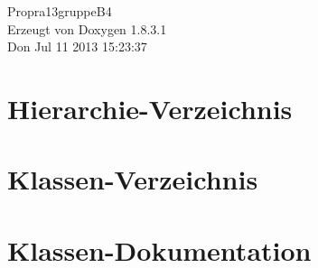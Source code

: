 \documentclass{book}
\begin{document}
\hypersetup{pageanchor=false,citecolor=blue}
\begin{titlepage}
\vspace*{7cm}
\begin{center}
{\Large Propra13gruppe\-B4 }\\
\vspace*{1cm}
{\large Erzeugt von Doxygen 1.8.3.1}\\
\vspace*{0.5cm}
{\small Don Jul 11 2013 15:23:37}\\
\end{center}
\end{titlepage}
\clearemptydoublepage
{}
\tableofcontents
\clearemptydoublepage
{}
\hypersetup{pageanchor=true,citecolor=blue}
\chapter{Hierarchie-\/\-Verzeichnis}

\chapter{Klassen-\/\-Verzeichnis}

\chapter{Klassen-\/\-Dokumentation}
































\printindex
\end{document}
